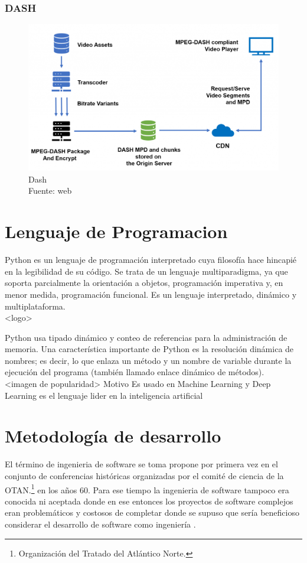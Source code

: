 \subsubsection{DASH}
\begin{figure}[H]
    \begin{center}
        \includegraphics[width=12cm]{img/capitulo_2/dash.png}
    \end{center}
    \caption{Dash\\Fuente: web}
    \label{fig:classical_ml}
\end{figure}


\section{Lenguaje de Programacion}
Python es un lenguaje de programación interpretado cuya filosofía hace hincapié en la legibilidad de su código. Se trata de un lenguaje multiparadigma, ya que soporta parcialmente la orientación a objetos, programación imperativa y, en menor medida, programación funcional. Es un lenguaje interpretado, dinámico y multiplataforma.\\

<logo>

Python usa tipado dinámico y conteo de referencias para la administración de memoria. Una característica importante de Python es la resolución dinámica de nombres; es decir, lo que enlaza un método y un nombre de variable durante la ejecución del programa (también llamado enlace dinámico de métodos).\\

<imagen de popularidad>
Motivo
Es usado en Machine Learning y Deep Learning es el lenguaje lider en la inteligencia artificial

\section{Metodología de desarrollo}
El término de ingenieria de software se toma propone por primera vez en el conjunto de conferencias históricas organizadas por el comité de ciencia de la OTAN.\footnote{Organización del Tratado del Atlántico Norte.} en los años 60. Para ese tiempo la ingenieria de software tampoco era conocida ni aceptada donde en ese entonces los proyectos de software complejos eran problemáticos y costosos de completar donde se supuso que sería beneficioso considerar el desarrollo de software como ingeniería \cite{Ganis}.\\

